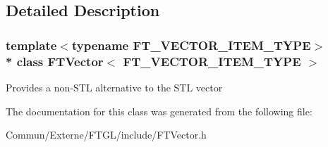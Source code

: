 \subsection{Detailed Description}
\subsubsection*{template$<$typename F\+T\+\_\+\+V\+E\+C\+T\+O\+R\+\_\+\+I\+T\+E\+M\+\_\+\+T\+Y\+PE$>$\\*
class F\+T\+Vector$<$ F\+T\+\_\+\+V\+E\+C\+T\+O\+R\+\_\+\+I\+T\+E\+M\+\_\+\+T\+Y\+P\+E $>$}

Provides a non-\/\+S\+TL alternative to the S\+TL vector 

The documentation for this class was generated from the following file\+:\begin{DoxyCompactItemize}
\item 
Commun/\+Externe/\+F\+T\+G\+L/include/F\+T\+Vector.\+h\end{DoxyCompactItemize}
